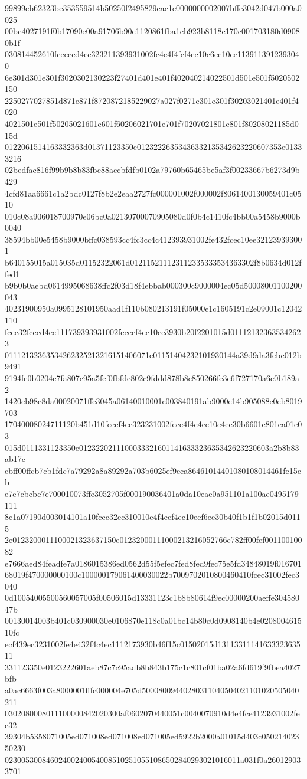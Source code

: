 99899cb62323be353559514b50250f2495829eac1e0000000002007bffe3042d047b000a0025
00bc4027191f0b17090e00a91706b90e1120861fba1cb923b8118c170c001703180d09080b1f
030814452610fcecccd4ec323211393931002fc4e4f4fcf4ec10c6ee10ee1139113912393040
6e301d301e301f3020302130223f27401d401e401f402040214022501d501e501f5020502150
2250277027851d871e871f8720872185229027a027f0271e301e301f30203021401e401f4020
4021501e501f50205021601e601f60206021701e701f70207021801e801f80208021185d015d
0122061514163332363d01371123350e01232226353436332135342623220607353e01333216
02bedfac816f99b9b8b83fbc88accbfdfb0102a79760b65465be5af3f00233667b6273d9b429
4cfd81aa6661c1a2bdc0127f8b2e2eaa2727fc000001002f000002f8061400130059401c0510
010c08a906018700970e06bc0a02130700070905080d0f0b4c1410fc4bb00a5458b9000b0040
38594bb00e5458b9000bffc038593cc4fc3cc4c412393931002fe432fcec10ee321239393001
b640155015a015035d01152322061d012115211123112335333534363302f8b0634d012ffed1
b9b0b0aebd0614995068638ffc2f03d18f4ebbab000300c9000004ec05d50008001100200043
40231900950a0995128101950aad1f110b080213191f05000e1c1605191c2e09001c12042110
fcec32fcecd4ec111739393931002fececf4ec10ee3930b20f2201015d011121323635342623
01112132363534262325213216151406071e01151404232101930144a39d9da3febc012b9491
9194fe0b0204e7fa807c95a5fef0fbfde802c9fddd878b8c850266fe3e6f727170a6c0b189a2
1420cb98c8da00020071ffe3045a06140010001c003840191ab9000e14b905088c0eb8019703
17040008024711120b451d10fcecf4ec323231002fece4f4c4ec10c4ee30b6601e801ea01e03
015d0111331123350e0123220211100033321601141633323635342623220603a2b8b83ab17c
cbff00ffcb7cb1fdc7a79292a8a89292a703b6025ef9eca86461014401080108014461fe15cb
e7e7cbcbe7e700010073ffe3052705f000190036401a0da10eae0a951101a100ae0495179111
8c1a07190d003014101a10fcec32ec310010e4f4ecf4ec10eef6ee30b40f1b1f1b02015d0115
2e0123200011100021323637150e01232000111000213216052766e782ff00fef00110010082
e7666aed84feadfe7a0186015386ed0562d55f5efec7fed8fed9fec75e5fd34848019f016701
68019f470000000100c100000179061400030022b7009702010800460410fcec31002fec3040
0d10054005500560057005f00506015d13331123c1b8b80614f9ec00000200aeffe30458047b
00130014003b401c030900030e0106870e118c0a01bc14b80c0d0908140b4e020800461510fc
ecf439ec3231002fe4e432f4c4ec1112173930b46f15c01502015d1311331114163332363511
331123350e0123222601aeb87c7c95adb8b843b175c1c801cf01ba02a6fd619f9fbea4027bfb
a0ac6663f003a8000001fffc000004e705d50008009440280311040504021101020505040211
0302080008011100000842020300af0602070440051c0040070910d4e4fce4123931002fec32
39304b5358071005ed071008ed071008ed071005ed5922b2000a01015d403c05021402350230
023005300846024002400540085102510551086502840293021016011a031f0a260129033701
